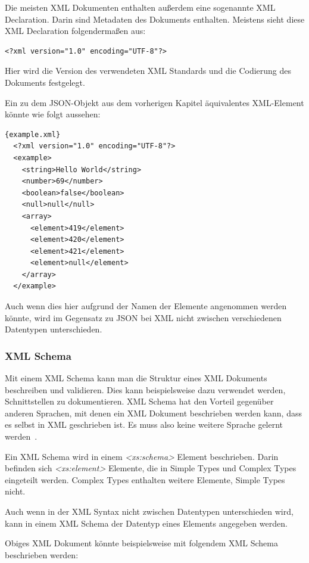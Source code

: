Die meisten XML Dokumenten enthalten außerdem eine sogenannte XML Declaration.
Darin sind Metadaten des Dokuments enthalten.
Meistens sieht diese XML Declaration folgendermaßen aus:

\begin{lstlisting}
<?xml version="1.0" encoding="UTF-8"?>
\end{lstlisting}

Hier wird die Version des verwendeten XML Standards und die Codierung des Dokuments festgelegt.

Ein zu dem JSON-Objekt aus dem vorherigen Kapitel äquivalentes XML-Element könnte wie folgt aussehen:

\begin{lstlisting}[label={lst:example.xml}]{example.xml}
  <?xml version="1.0" encoding="UTF-8"?>
  <example>
    <string>Hello World</string>
    <number>69</number>
    <boolean>false</boolean>
    <null>null</null>
    <array>
      <element>419</element>
      <element>420</element>
      <element>421</element>
      <element>null</element>
    </array>
  </example>
\end{lstlisting}

Auch wenn dies hier aufgrund der Namen der Elemente angenommen werden könnte, wird im Gegensatz zu JSON bei XML
nicht zwischen verschiedenen Datentypen unterschieden.

\subsubsection{XML Schema}
Mit einem XML Schema kann man die Struktur eines XML Dokuments beschreiben und validieren.
Dies kann beispielsweise dazu verwendet werden, Schnittstellen zu dokumentieren.
XML Schema hat den Vorteil gegenüber anderen Sprachen, mit denen ein XML Dokument beschrieben werden kann, dass es
selbst in XML geschrieben ist.
Es muss also keine weitere Sprache gelernt werden~\cite{xml-schema}.

Ein XML Schema wird in einem \textit{<xs:schema>} Element beschrieben.
Darin befinden sich \textit{<xs:element>} Elemente, die in Simple Types und Complex Types eingeteilt werden.
Complex Types enthalten weitere Elemente, Simple Types nicht.

Auch wenn in der XML Syntax nicht zwischen Datentypen unterschieden wird, kann in einem XML Schema der Datentyp
eines Elements angegeben werden.

Obiges XML Dokument könnte beispielsweise mit folgendem XML Schema beschrieben werden:

